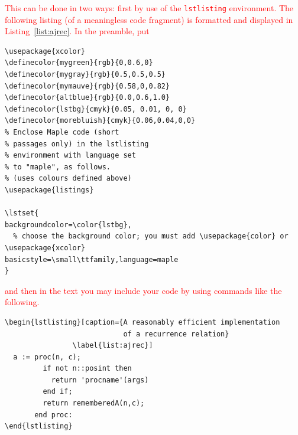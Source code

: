 \documentclass[anonymous,review,acmsmall,screen]{MapleTrans}
\begin{document}
\textcolor{red}{This can be done in two ways: first by use of the \texttt{lstlisting} environment.  The following listing (of a meaningless code fragment) is formatted and displayed in Listing~\ref{list:ajrec}.
}
\textcolor{red}{In the preamble, put}
\begin{verbatim}
\usepackage{xcolor}
\definecolor{mygreen}{rgb}{0,0.6,0}
\definecolor{mygray}{rgb}{0.5,0.5,0.5}
\definecolor{mymauve}{rgb}{0.58,0,0.82}
\definecolor{altblue}{rgb}{0.0,0.6,1.0}
\definecolor{lstbg}{cmyk}{0.05, 0.01, 0, 0}
\definecolor{morebluish}{cmyk}{0.06,0.04,0,0}
% Enclose Maple code (short
% passages only) in the lstlisting
% environment with language set
% to "maple", as follows.
% (uses colours defined above)
\usepackage{listings}

\lstset{
backgroundcolor=\color{lstbg},
  % choose the background color; you must add \usepackage{color} or \usepackage{xcolor}
basicstyle=\small\ttfamily,language=maple
}
\end{verbatim}
\textcolor{red}{and then in the text you may include your code by using commands like the following.}
\begin{verbatim}
\begin{lstlisting}[caption={A reasonably efficient implementation
                            of a recurrence relation}
                \label{list:ajrec}]
  a := proc(n, c);
         if not n::posint then
           return 'procname'(args)
         end if;
         return rememberedA(n,c);
       end proc:
\end{lstlisting}
\end{verbatim}
\end{document}
